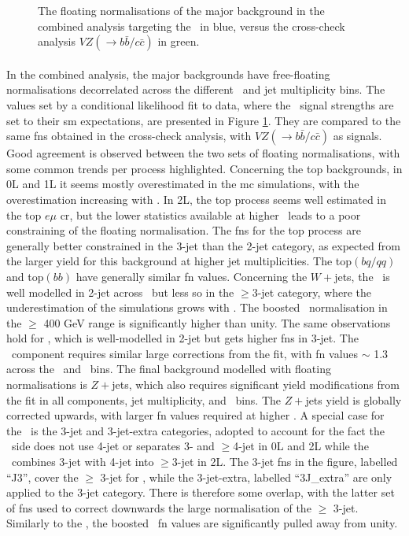 \begin{figure}[h!]
    \caption{The floating normalisations of the major background in the combined analysis targeting the \vhbc\ in blue, versus the cross-check analysis $VZ(\rightarrow b\bar{b}/c\bar{c})$ in green.}
    \label{fig:FNback}
\end{figure} 

\paragraph{}In the combined analysis, the major backgrounds have free-floating normalisations decorrelated across the different \ptv\ and jet multiplicity bins. The values set by a conditional likelihood fit to data, where the \vhbc\ signal strengths are set to their \gls{sm} expectations, are presented in Figure \ref{fig:FNback}. They are compared to the same \glspl{fn} obtained in the cross-check analysis, with $VZ(\rightarrow b\bar{b}/c\bar{c})$ as signals. Good agreement is observed between the two sets of floating normalisations, with some common trends per process highlighted. Concerning the top backgrounds, in 0L and 1L it seems mostly overestimated in the \gls{mc} simulations, with the overestimation increasing with \ptv. In 2L, the top process seems well estimated in the top $e\mu$ \gls{cr}, but the lower statistics available at higher \ptv\ leads to a poor constraining of the floating normalisation. The \glspl{fn} for the top process are generally better constrained in the 3-jet than the 2-jet category, as expected from the larger yield for this background at higher jet multiplicities. The top$(bq/qq)$ and top$(bb)$ have generally similar \gls{fn} values. Concerning the $W+$jets, the \whf\ is well modelled in 2-jet across \ptv\ but less so in the $\geq$3-jet category, where the underestimation of the simulations grows with \ptv. The boosted \whf\ normalisation in the $\geq$ 400 GeV range is significantly higher than unity. The same observations hold for \wlf, which is well-modelled in 2-jet but gets higher \glspl{fn} in 3-jet. The \wmf\ component requires similar large corrections from the fit, with \gls{fn} values $\sim$ 1.3 across the \nj\ and \ptv\ bins. The final background modelled with floating normalisations is $Z+$jets, which also requires significant yield modifications from the fit in all components, jet multiplicity, and \ptv\ bins. The $Z+$jets yield is globally corrected upwards, with larger \gls{fn} values required at higher \ptv. A special case for the \zhf\ is the 3-jet and 3-jet-extra categories, adopted to account for the fact the \vhc\ side does not use 4-jet or separates 3- and $\geq$4-jet in 0L and 2L while the \vhb\ combines 3-jet with 4-jet into $\geq$3-jet in 2L. The 3-jet \glspl{fn} in the figure, labelled ``J3'', cover the $\geq$ 3-jet for \vhb, while the 3-jet-extra, labelled ``3J\_extra'' are only applied to the 3-jet category. There is therefore some overlap, with the latter set of \glspl{fn} used to correct downwards the large normalisation of the $\geq$ 3-jet. Similarly to the \whf, the boosted \zhf\ \gls{fn} values are significantly pulled away from unity.
  
